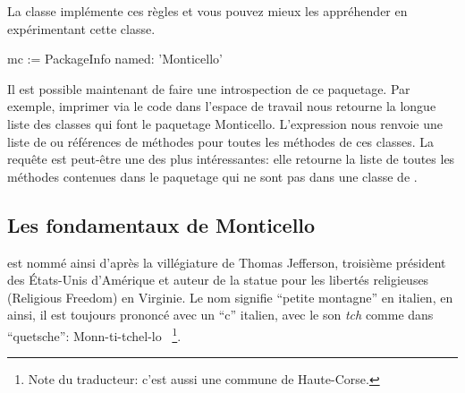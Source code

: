\documentclass[a4paper,10pt,twoside]{book}
\begin{document}
La classe  implémente ces règles et vous pouvez mieux les 
appréhender en expérimentant cette classe.



\begin{code}{}
mc := PackageInfo named: 'Monticello'
\end{code}

Il est possible maintenant de faire une introspection de ce paquetage.
Par exemple, imprimer via  le code  dans l'espace de travail nous retourne la longue liste des classes qui font le paquetage Monticello. L'expression 
nous renvoie une liste de \mbox{} ou références de méthodes
pour toutes les méthodes de ces classes.
La requête  est peut-être une des plus
intéressantes: elle retourne la liste de toutes les méthodes contenues
dans le paquetage  qui ne sont pas dans une classe de
. %




\subsection{Les fondamentaux de Monticello}

 est nommé ainsi d'après la villégiature 
de Thomas Jefferson, troisième président des États-Unis d'Amérique
et auteur de la statue pour les libertés religieuses (Religious Freedom) en
Virginie. Le nom signifie ``petite montagne'' en italien, en ainsi, il est
toujours prononcé avec un ``c'' italien, \ie avec le son \emph{tch} comme
dans ``quetsche'':
Monn-ti-tchel-lo%
~\footnote{Note du traducteur: c'est aussi une commune de Haute-Corse.}.
\end{document}
